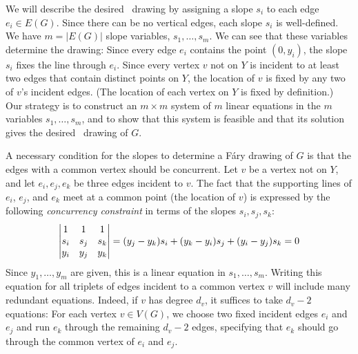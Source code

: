 
We will describe the desired \Fary\ drawing by assigning a slope $s_i$
to each edge $e_i\in E(G)$.   Since there can be no vertical edges,
each slope $s_i$ is well-defined. We have $m=|E(G)|$ slope variables,
$s_1,\ldots,s_m$. 
We can see that these variables determine the drawing:
 Since every edge $e_i$ contains the point $(0,y_i)$,
the slope $s_i$ fixes the line through $e_i$.  Since every vertex $v$
not on $Y$ is incident to at least two edges that contain distinct points
on $Y$, the location of $v$ is fixed by any two of $v$'s incident edges.  
(The location of each vertex on
$Y$ is fixed by definition.)  Our strategy is to construct an $m\times m$
system of $m$ linear equations in the $m$ variables $s_1,\ldots,s_m$,
and to show that
this system is feasible and that its solution gives the desired \Fary\
drawing of $G$.

A necessary condition for the slopes to determine a F\'ary drawing of
$G$ is that the %
edges 
with a common vertex should be concurrent. Let $v$ be a vertex 
not on $Y$, and let $e_i, e_j, e_k$ be three edges incident to $v$.
The fact that the supporting lines of $e_i$, $e_j$, and $e_k$
meet at a common point (the location of $v$) is expressed by the following
\emph{concurrency constraint} in terms of the slopes $s_i,s_j,s_k$:
\begin{equation}\eqlabel{slope0} 
\left|
\begin{matrix}
1&1&1\\
s_i&s_j&s_k\\
y_i&y_j&y_k
\end{matrix}
\right|=
({y_j-y_k}) s_i + ({y_k-y_i}) s_j 
+ ({y_i-y_j})s_k  = 0
\end{equation}
Since $y_1,\ldots,y_m$ are given, this is a linear equation
in $s_1,\ldots,s_m$.
Writing this equation for all triplets of edges incident to a common
vertex $v$ will include many redundant equations. Indeed,
if $v$ has degree $d_v$,
it suffices to take $d_v-2$ equations: For each vertex $v\in V(G)$, we choose two fixed
incident edges $e_i$ and $e_j$ and run $e_k$ through the remaining
$d_v-2$ edges, specifying that $e_k$ should go through the common vertex
of $e_i$ and $e_j$.

